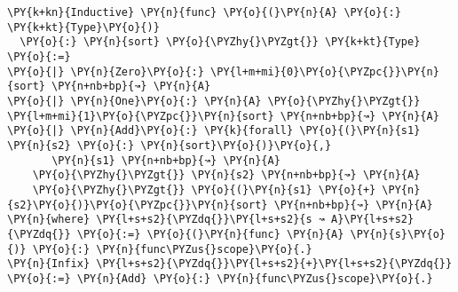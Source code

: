 {\small
\begin{Verbatim}[commandchars=\\\{\}]
\PY{k+kn}{Inductive} \PY{n}{func} \PY{o}{(}\PY{n}{A} \PY{o}{:} \PY{k+kt}{Type}\PY{o}{)}
  \PY{o}{:} \PY{n}{sort} \PY{o}{\PYZhy{}\PYZgt{}} \PY{k+kt}{Type} \PY{o}{:=}
\PY{o}{|} \PY{n}{Zero}\PY{o}{:} \PY{l+m+mi}{𝟶}\PY{o}{\PYZpc{}}\PY{n}{sort} \PY{n+nb+bp}{↝} \PY{n}{A}
\PY{o}{|} \PY{n}{One}\PY{o}{:} \PY{n}{A} \PY{o}{\PYZhy{}\PYZgt{}} \PY{l+m+mi}{𝟷}\PY{o}{\PYZpc{}}\PY{n}{sort} \PY{n+nb+bp}{↝} \PY{n}{A}
\PY{o}{|} \PY{n}{Add}\PY{o}{:} \PY{k}{forall} \PY{o}{(}\PY{n}{s1} \PY{n}{s2} \PY{o}{:} \PY{n}{sort}\PY{o}{)}\PY{o}{,}
       \PY{n}{s1} \PY{n+nb+bp}{↝} \PY{n}{A}
    \PY{o}{\PYZhy{}\PYZgt{}} \PY{n}{s2} \PY{n+nb+bp}{↝} \PY{n}{A}
    \PY{o}{\PYZhy{}\PYZgt{}} \PY{o}{(}\PY{n}{s1} \PY{o}{+} \PY{n}{s2}\PY{o}{)}\PY{o}{\PYZpc{}}\PY{n}{sort} \PY{n+nb+bp}{↝} \PY{n}{A}
\PY{n}{where} \PY{l+s+s2}{\PYZdq{}}\PY{l+s+s2}{s ↝ A}\PY{l+s+s2}{\PYZdq{}} \PY{o}{:=} \PY{o}{(}\PY{n}{func} \PY{n}{A} \PY{n}{s}\PY{o}{)} \PY{o}{:} \PY{n}{func\PYZus{}scope}\PY{o}{.}
\PY{n}{Infix} \PY{l+s+s2}{\PYZdq{}}\PY{l+s+s2}{+}\PY{l+s+s2}{\PYZdq{}} \PY{o}{:=} \PY{n}{Add} \PY{o}{:} \PY{n}{func\PYZus{}scope}\PY{o}{.}
\end{Verbatim}
}
